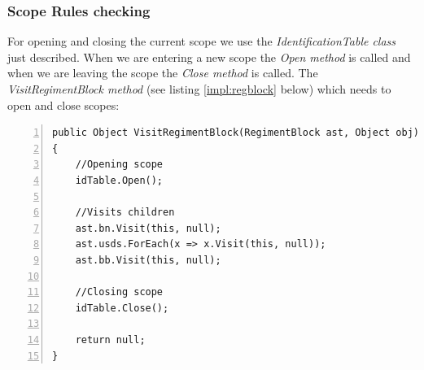 		\subsubsection{Scope Rules checking}
			For opening and closing the current scope we use the {\it IdentificationTable class} just described.
			When we are entering a new scope the {\it Open method} is called and when we are leaving the scope the {\it Close method} is called.
			The {\it VisitRegimentBlock method} (see listing \ref{impl:regblock} below)  which needs to open and close scopes: \\
			\begin{lstlisting}[basicstyle=\small\sffamily,
					keywords={break,case,const,continue,default,else,enum,
					for,if,return,switch,while,do,long,void,int,float,double,
					char,struct,typedef,include,size\_t},
					keywordstyle={\color{blue}},
					comment={[l]{//}}, morecomment={[s]{/*}{*/}}, commentstyle=\itshape,
					columns={[l]flexible}, numbers=left, numberstyle=\tiny,
					frameround=fftt, frame=shadowbox, captionpos=b,
					caption={The IdentificationTable class},
					label=impl:regblock]
public Object VisitRegimentBlock(RegimentBlock ast, Object obj)
{
	//Opening scope
	idTable.Open();
	
	//Visits children
    ast.bn.Visit(this, null);
    ast.usds.ForEach(x => x.Visit(this, null));
    ast.bb.Visit(this, null);
    
    //Closing scope
    idTable.Close();
    
	return null;
}
			 \end{lstlisting}
		
